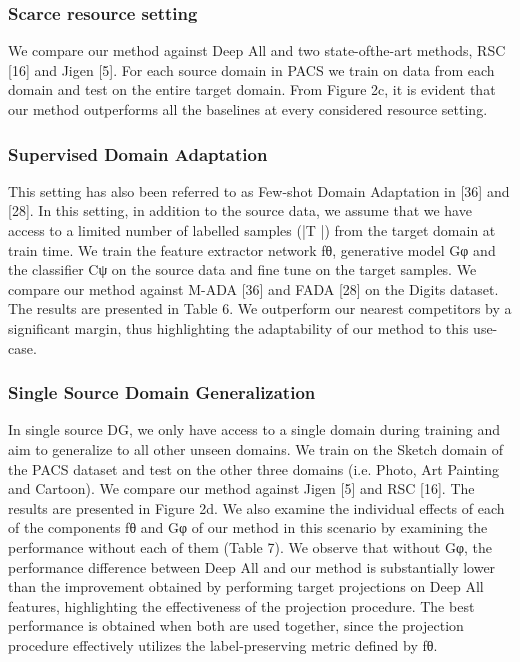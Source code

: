 \documentclass[review]{cvpr}
\begin{document}
\subsubsection{Scarce resource setting}
We compare our method against Deep All and two state-ofthe-art methods, RSC [16] and Jigen [5]. For each source
domain in PACS we train on data
from each domain and test on the entire target domain.
From Figure 2c, it is evident that our method outperforms
all the baselines at every considered resource setting.
\subsubsection{Supervised Domain Adaptation}
This setting has also been referred to as Few-shot Domain
Adaptation in [36] and [28]. In this setting, in addition to
the source data, we assume that we have access to a limited
number of labelled samples (|T |) from the target domain at
train time. We train the feature extractor network fθ, generative model Gφ and the classifier Cψ on the source data and
fine tune on the target samples. We compare our method
against M-ADA [36] and FADA [28] on the Digits dataset.
The results are presented in Table 6. We outperform our
nearest competitors by a significant margin, thus highlighting the adaptability of our method to this use-case.
\subsubsection{Single Source Domain Generalization}
In single source DG, we only have access to a single domain
during training and aim to generalize to all other unseen domains. We train on the Sketch domain of the PACS dataset
and test on the other three domains (i.e. Photo, Art Painting
and Cartoon). We compare our method against Jigen [5] and
RSC [16]. The results are presented in Figure 2d. We also
examine the individual effects of each of the components fθ
and Gφ of our method in this scenario by examining the performance without each of them (Table 7). We observe that
without Gφ, the performance difference between Deep All
and our method is substantially lower than the improvement
obtained by performing target projections on Deep All features, highlighting the effectiveness of the projection procedure. The best performance is obtained when both are used
together, since the projection procedure effectively utilizes
the label-preserving metric defined by fθ.
\end{document}
